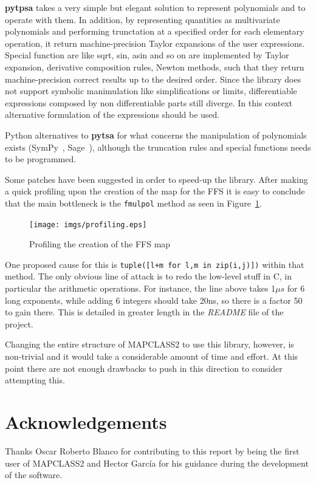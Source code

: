 \documentclass[a4paper]{cernatsnote}
\begin{document}
\textbf{pytpsa} takes a very simple but elegant solution to represent
polynomials and to operate with them. In addition, by representing quantities
as multivariate polynomials and performing trunctation at a specified order
for each elementary operation, it return machine-precision Taylor expansions
of the user expressions. Special function are like sqrt, sin, asin and so on
are implemented by Taylor expansion, derivative composition rules, Newton
methods, such that they return machine-precision correct results up to the
desired order. Since the library does not support symbolic manimulation like
simplifications or limits, differentiable expressions composed by non
differentiable parts still diverge. In this context alternative formulation of
the expressions should be used.

Python alternatives to \textbf{pytsa} for what concerns the manipulation of
polynomials exists (SymPy~\cite{sympy}, Sage~\cite{sagemath}), although the
truncation rules and special functions needs to be programmed.

Some patches have been suggested in order to speed-up the library.  After
making a quick profiling upon the creation of the map for the FFS it is easy
to conclude that the main bottleneck is the \texttt{fmulpol} method as seen in
Figure~\ref{profiling}.

\begin{figure}[!hbt]
  \centering
  \texttt{[image: imgs/profiling.eps]}
  \caption{Profiling the creation of the FFS map}
  \label{profiling}
\end{figure}

One proposed cause for this is \texttt{tuple([l+m for l,m in zip(i,j)])}
within that method. The only obvious line of attack is to redo the low-level
stuff in C, in particular the arithmetic operations. For instance, the line
above takes 1$\mu s$ for 6 long exponents, while adding 6 integers should take
20ns, so there is a factor 50 to gain there. This is detailed in greater
length in the \textit{README} file of the project.

Changing the entire structure of \textsc{MAPCLASS2} to use this library,
however, is non-trivial and it would take a considerable amount of time and
effort. At this point there are not enough drawbacks to push in this direction
to consider attempting this.

\section*{Acknowledgements}
Thanks Oscar Roberto Blanco for contributing to this report by being
the first user of \textsc{MAPCLASS2} and Hector Garc\'ia for his
guidance during the development of the software.
\end{document}
